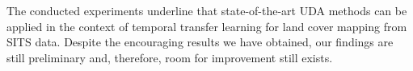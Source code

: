 The conducted experiments underline that state-of-the-art UDA methods can be applied in the context of temporal transfer learning for land cover mapping from SITS data. Despite the encouraging results we have obtained, our findings are still preliminary and, therefore, room for improvement still exists. 

